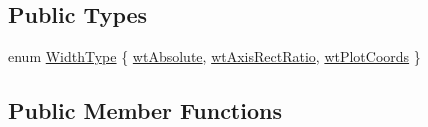 \subsection*{Public Types}
\begin{DoxyCompactItemize}
\item 
enum \hyperlink{classQCPBars_a65dbbf1ab41cbe993d71521096ed4649}{Width\+Type} \{ \hyperlink{classQCPBars_a65dbbf1ab41cbe993d71521096ed4649ab74315c9aa77df593c58dd25dfc0de35}{wt\+Absolute}, 
\hyperlink{classQCPBars_a65dbbf1ab41cbe993d71521096ed4649a90bc09899361ad3422ff277f7c790ffe}{wt\+Axis\+Rect\+Ratio}, 
\hyperlink{classQCPBars_a65dbbf1ab41cbe993d71521096ed4649aad3cc60ae1bfb1160a30237bee9eaf10}{wt\+Plot\+Coords}
 \}
\end{DoxyCompactItemize}
\subsection*{Public Member Functions}
